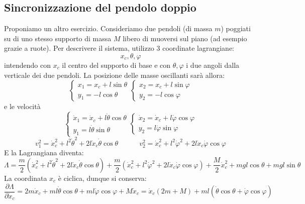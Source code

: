 \documentclass[a4paper,openany]{article}
\begin{document}
	\subsection{Sincronizzazione del pendolo doppio}
	Proponiamo un altro esercizio. Consideriamo due pendoli (di massa $m$) poggiati su di uno stesso supporto di massa $M$ libero di muoversi sul piano (ad esempio grazie a ruote). Per descrivere il sistema, utilizzo 3 coordinate lagrangiane:
	$$
	x_c,\theta,\varphi
	$$
	intendendo con $x_c$ il centro del supporto di base e con $\theta,\varphi$ i due angoli dalla verticale dei due pendoli. 
	La posizione delle masse oscillanti sarà allora:
	\begin{equation}
		\begin{cases}
		x_1 = x_c + l\sin\theta \\
		y_1 = -l\cos\theta
		\end{cases}
	\begin{cases}
		x_2 = x_c + l\sin\varphi \\
		y_2 = -l\cos\varphi
	\end{cases}
	\end{equation}
e le velocità
\begin{equation}
	\begin{cases}
		\dot{x}_1 = \dot{x}_c + l\dot{\theta}\cos\theta \\
		y_1 = l\dot{\theta}\sin\theta
	\end{cases}
	\begin{cases}
		\dot{x}_2 = \dot{x}_c + l\dot{\varphi}\cos\varphi \\
		y_2 = l\dot{\varphi}\sin\varphi
	\end{cases}
\end{equation}
\begin{equation}\label{key}
	v_1^2 = \dot{x}_c^2 + l^2\dot{\theta}^2+2l\dot{x}_c\dot{\theta}\cos\theta
	\quad \quad \quad 
	v_2^2 = \dot{x}_c^2 + l^2\dot{\varphi}^2+2l\dot{x}_c\dot{\varphi}\cos\varphi
\end{equation}
E la Lagrangiana diventa:
\begin{equation}\label{key}
	\Lambda = \dfrac{m}{2}(\dot{x}_c^2 + l^2\dot{\theta}^2+2l\dot{x}_c\dot{\theta}\cos\theta)+ \dfrac{m}{2}(\dot{x}_c^2 + l^2\dot{\varphi}^2+2l\dot{x}_c\dot{\varphi}\cos\varphi) + \dfrac{M}{2}\dot{x}_c^2 + mgl\cos\theta + mgl\sin\theta
\end{equation}
La coordinata $x_c$ è ciclica, dunque si conserva:
$$
\dfrac{\partial \Lambda}{\partial \dot{x}_c} = 2m\dot{x}_c +m l\dot{\theta}\cos\theta+ ml\dot{\varphi}\cos\varphi + M\dot{x}_c = \dot{x}_c(2m+M) + ml(\dot\theta\cos\theta+\dot\varphi\cos\varphi)
$$
\end{document}
